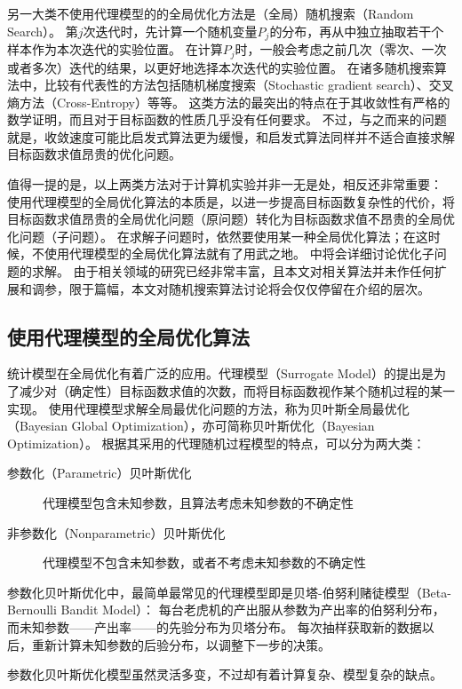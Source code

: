 \documentclass[index]{subfiles}
\begin{document}
另一大类不使用代理模型的的全局优化方法是（全局）随机搜索（Random Search）。
第$j$次迭代时，先计算一个随机变量$P_j$的分布，再从中独立抽取若干个样本作为本次迭代的实验位置。
在计算$P_j$时，一般会考虑之前几次（零次、一次或者多次）迭代的结果，以更好地选择本次迭代的实验位置。
在诸多随机搜索算法中，比较有代表性的方法包括随机梯度搜索（Stochastic gradient search）、交叉熵方法（Cross-Entropy）等等\cite{zabinsky2009}。
这类方法的最突出的特点在于其收敛性有严格的数学证明，而且对于目标函数的性质几乎没有任何要求\cite{zhigljavsky2007}。
不过，与之而来的问题就是，收敛速度可能比启发式算法更为缓慢，和启发式算法同样并不适合直接求解目标函数求值昂贵的优化问题。

值得一提的是，以上两类方法对于计算机实验并非一无是处，相反还非常重要：
使用代理模型的全局优化算法的本质是，以进一步提高目标函数复杂性的代价，将目标函数求值昂贵的全局优化问题（原问题）转化为目标函数求值不昂贵的全局优化问题（子问题）。
在求解子问题时，依然要使用某一种全局优化算法；在这时候，不使用代理模型的全局优化算法就有了用武之地。
中将会详细讨论优化子问题的求解。
由于相关领域的研究已经非常丰富，且本文对相关算法并未作任何扩展和调参，限于篇幅，本文对随机搜索算法讨论将会仅仅停留在介绍的层次。

\subsection{使用代理模型的全局优化算法}\label{ssec:go-mdl}
统计模型在全局优化有着广泛的应用。代理模型（Surrogate Model）的提出是为了减少对（确定性）目标函数求值的次数，而将目标函数视作某个随机过程的某一实现。
使用代理模型求解全局最优化问题的方法，称为贝叶斯全局最优化（Bayesian Global Optimization），亦可简称贝叶斯优化（Bayesian Optimization）。
根据其采用的代理随机过程模型的特点，可以分为两大类：
\begin{description}
  \item[参数化（Parametric）贝叶斯优化] 代理模型包含未知参数，且算法考虑未知参数的不确定性
  \item[非参数化（Nonparametric）贝叶斯优化] 代理模型不包含未知参数，或者不考虑未知参数的不确定性
\end{description}

参数化贝叶斯优化中，最简单最常见的代理模型即是贝塔-伯努利赌徒模型（Beta-Bernoulli Bandit Model）：
每台老虎机的产出服从参数为产出率的伯努利分布，而未知参数——产出率——的先验分布为贝塔分布。
每次抽样获取新的数据以后，重新计算未知参数的后验分布，以调整下一步的决策。\cite{shahriari2016}

参数化贝叶斯优化模型虽然灵活多变，不过却有着计算复杂、模型复杂的缺点。
\end{document}
